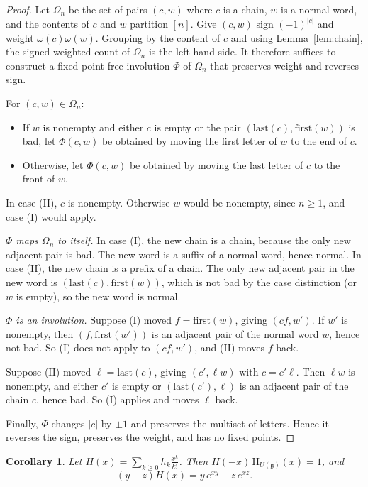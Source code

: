 \documentclass[11pt]{amsart}
\newtheorem{corollary}[theorem]{Corollary}
\theoremstyle{definition}
\theoremstyle{remark}
\newcommand{\g}{\mathfrak{g}}
\newcommand{\Hs}{\mathrm{H}}
\begin{document}
\begin{proof}
Let $\Omega_n$ be the set of pairs $(c,w)$ where $c$ is a chain, $w$ is a normal word, and the contents of $c$ and $w$ partition $[n]$. Give $(c,w)$ sign $(-1)^{|c|}$ and weight $\omega(c)\omega(w)$. Grouping by the content of $c$ and using Lemma~\ref{lem:chain}, the signed weighted count of $\Omega_n$ is the left-hand side. It therefore suffices to construct a fixed-point-free involution $\Phi$ of $\Omega_n$ that preserves weight and reverses sign.

For $(c,w)\in\Omega_n$:
\begin{itemize}
\item[(I)] If $w$ is nonempty and either $c$ is empty or the pair $(\mathrm{last}(c),\mathrm{first}(w))$ is bad, let $\Phi(c,w)$ be obtained by moving the first letter of $w$ to the end of $c$.
\item[(II)] Otherwise, let $\Phi(c,w)$ be obtained by moving the last letter of $c$ to the front of $w$.
\end{itemize}

In case (II), $c$ is nonempty. Otherwise $w$ would be nonempty, since $n\ge1$, and case (I) would apply.

\emph{$\Phi$ maps $\Omega_n$ to itself.} In case (I), the new chain is a chain, because the only new adjacent pair is bad. The new word is a suffix of a normal word, hence normal. In case (II), the new chain is a prefix of a chain. The only new adjacent pair in the new word is $(\mathrm{last}(c),\mathrm{first}(w))$, which is not bad by the case distinction (or $w$ is empty), so the new word is normal.

\emph{$\Phi$ is an involution.} Suppose (I) moved $f=\mathrm{first}(w)$, giving $(cf,w')$. If $w'$ is nonempty, then $(f,\mathrm{first}(w'))$ is an adjacent pair of the normal word $w$, hence not bad. So (I) does not apply to $(cf,w')$, and (II) moves $f$ back.

Suppose (II) moved $\ell=\mathrm{last}(c)$, giving $(c',\ell w)$ with $c=c'\ell$. Then $\ell w$ is nonempty, and either $c'$ is empty or $(\mathrm{last}(c'),\ell)$ is an adjacent pair of the chain $c$, hence bad. So (I) applies and moves $\ell$ back.

Finally, $\Phi$ changes $|c|$ by $\pm1$ and preserves the multiset of letters. Hence it reverses the sign, preserves the weight, and has no fixed points.
\end{proof}

\begin{corollary}\label{cor:Useries}
Let $H(x)=\sum_{k\ge0}h_k\frac{x^k}{k!}$. Then $H(-x)\,\Hs_{U(\g)}(x)=1$, and
\[
(y-z)H(x)=y\,e^{xy}-z\,e^{xz}.
\]
\end{corollary}
\end{document}
